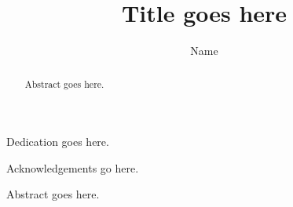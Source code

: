 \documentclass{ucdthesis}
\begin{document}
 

\title           {Title goes here}
\author          {Name}

\begin{abstract}
  Abstract goes here.
\end{abstract}

\begin{frontmatter}

\maketitle

\copyrightpage

\clearpage
\begin{dedication}
  \vspace*{\fill}
  \begin{center}
  {
    Dedication goes here.
  }
  \end{center}
  \vspace*{\fill}
\end{dedication}

\clearpage
\begin{acknowledgments}
  Acknowledgements go here.
\end{acknowledgments}

\clearpage
\tableofcontents
\listoffigures
\listoftables

\clearpage
\begin{inlineabstract}
  Abstract goes here.
\end{inlineabstract}

\end{frontmatter}

\end{document}
